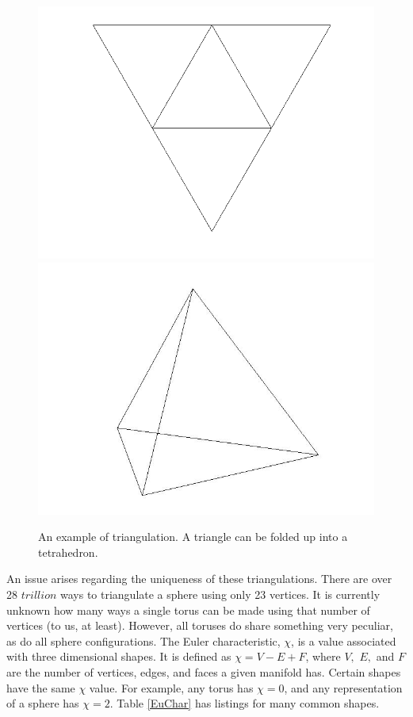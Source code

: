 \documentclass[12pt]{article}
\begin{document}
\begin{figure}
\includegraphics[scale = 0.5]{flattetrahedron.png}
\includegraphics[scale = 0.3]{tetrahedron.jpg}
\caption{An example of triangulation. A triangle can be folded up into a tetrahedron.}
\end{figure}

\noindent An issue arises regarding the uniqueness of these triangulations. There are over 28 $trillion$ ways to triangulate a sphere using only 23 vertices. It is currently unknown how many ways a single torus can be made using that number of vertices (to us, at least). However, all toruses do share something very peculiar, as do all sphere configurations. The Euler characteristic, $\chi$, is a value associated with three dimensional shapes. It is defined as $\displaystyle\chi = V - E + F$, where $V,$ $E,$ and $F$ are the number of vertices, edges, and faces a given manifold has. Certain shapes have the same $\chi$ value. For example, any torus has $\chi = 0$, and any representation of a sphere has $\chi = 2.$ Table \ref{EuChar} has listings for many common shapes. \newline
\end{document}
